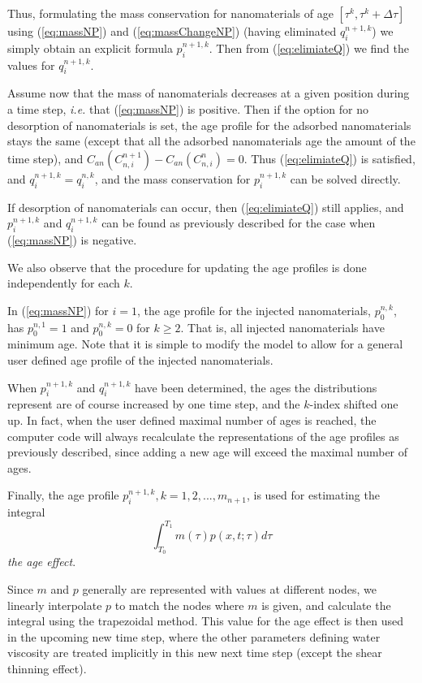 \documentclass[energies,article,submit,moreauthors,pdftex]{Definitions/mdpi}
\begin{document}
Thus, formulating the mass conservation for nanomaterials of age $\left[\tau^k, \tau^k+\Delta\tau\right]$ using (\ref{eq:massNP}) and (\ref{eq:massChangeNP}) (having eliminated  $q_i^{n+1,k}$) we simply obtain an explicit formula $p_i^{n+1,k}$. Then from (\ref{eq:elimiateQ}) we find the values for $q_i^{n+1,k}$.

Assume now that the mass of nanomaterials decreases at a given position during a time step, \textit{i.e.} that (\ref{eq:massNP}) is positive. Then if the option for no desorption of nanomaterials is set, the age profile for the adsorbed nanomaterials stays the same (except that all the adsorbed nanomaterials age the amount of the time step), and $C_{an}(C_{n,i}^{n+1})- C_{an}(C_{n,i}^{n})=0$. Thus (\ref{eq:elimiateQ}) is satisfied, and $q_i^{n+1,k}=q_i^{n,k}$, and the mass conservation for $p_i^{n+1,k}$ can be solved directly.

If desorption of nanomaterials can occur, then (\ref{eq:elimiateQ}) still applies, and $p_i^{n+1,k}$ and  $q_i^{n+1,k}$ can be found as previously described for the case when (\ref{eq:massNP}) is negative. 

We also observe that the procedure for updating the age profiles is done independently for each $k$.

In (\ref{eq:massNP}) for $i=1$, the age profile for the injected nanomaterials, $p_0^{n,k}$, has $p_0^{n,1}=1$ and $p_0^{n,k}=0$ for $k\geq2$. That is, all injected nanomaterials have minimum age. Note that it is simple to modify the model to allow for a general user defined age profile of the injected nanomaterials.

When $p_i^{n+1,k}$ and $q_i^{n+1,k}$ have been determined, the ages the distributions represent are of course increased by one time step, and the  $k$-index shifted one up. In fact, when the user defined maximal number of ages is reached, the computer code will always recalculate the representations of the age profiles as previously described, since adding a new age will exceed the maximal number of ages.

Finally, the age profile $p_i^{n+1,k},k=1,2,...,m_{n+1}$,  is used for estimating the integral
\begin{equation}
    \int_{T_0}^{T_1} m(\tau)p(x,t;\tau)d\tau
\end{equation}
\textit{the age effect}.

Since $m$ and $p$ generally are represented with values at different nodes, we linearly interpolate $p$ to match the nodes where $m$ is given, and calculate the integral using the trapezoidal method. This value for the age effect is then used in the upcoming new time step, where the other parameters defining water viscosity are treated implicitly in this new next time step (except the shear thinning effect).
\end{document}
